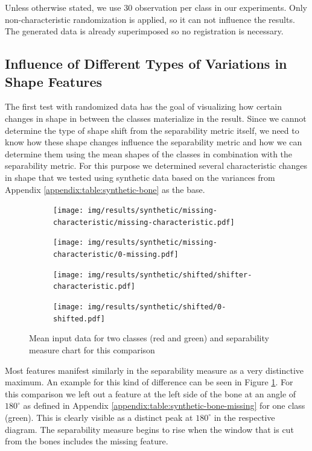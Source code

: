 \documentclass[pdftex,12pt,a4paper]{report}
\begin{document}
Unless otherwise stated, we use 30 observation per class in our experiments. Only non-characteristic randomization is applied, so it can not influence the results. The generated data is already superimposed so no registration is necessary.

\subsection{Influence of Different Types of Variations in Shape Features}

The first test with randomized data has the goal of visualizing how certain changes in shape in between the classes materialize in the result. Since we cannot determine the type of shape shift from the separability metric itself, we need to know how these shape changes influence the separability metric and how we can determine them using the mean shapes of the classes in combination with the separability metric. For this purpose we determined several characteristic changes in shape that we tested using synthetic data based on the variances from Appendix \ref{appendix:table:synthetic-bone} as the base.

\begin{figure}[h]
	\centering
	\begin{subfigure}[b]{0.45\textwidth}
		\centering
		\texttt{[image: img/results/synthetic/missing-characteristic/missing-characteristic.pdf]}
		\label{fig:diff:missing}
	\end{subfigure}
	\begin{subfigure}[b]{0.45\textwidth}
		\centering
		\texttt{[image: img/results/synthetic/missing-characteristic/0-missing.pdf]}
		\subcaption*{}
		\label{}
	\end{subfigure}
	\begin{subfigure}[b]{0.45\textwidth}
		\centering
		\texttt{[image: img/results/synthetic/shifted/shifter-characteristic.pdf]}
		\label{fig:diff:shifted}
	\end{subfigure}
	\begin{subfigure}[b]{0.45\textwidth}
		\centering
		\texttt{[image: img/results/synthetic/shifted/0-shifted.pdf]}
		\subcaption*{}
		\label{}
	\end{subfigure}
	\caption{Mean input data for two classes (red and green) and separability measure chart for this comparison}
	\label{fig:slic}
\end{figure}

Most features manifest similarly in the separability measure as a very distinctive maximum. An example for this kind of difference can be seen in Figure \ref{fig:diff:missing}. For this comparison we left out a feature at the left side of the bone at an angle of $180^\circ$ as defined in Appendix \ref{appendix:table:synthetic-bone-missing} for one class (green). This is clearly visible as a distinct peak at $180^\circ$ in the respective diagram. The separability measure begins to rise when the window that is cut from the bones includes the missing feature.  
\end{document}
